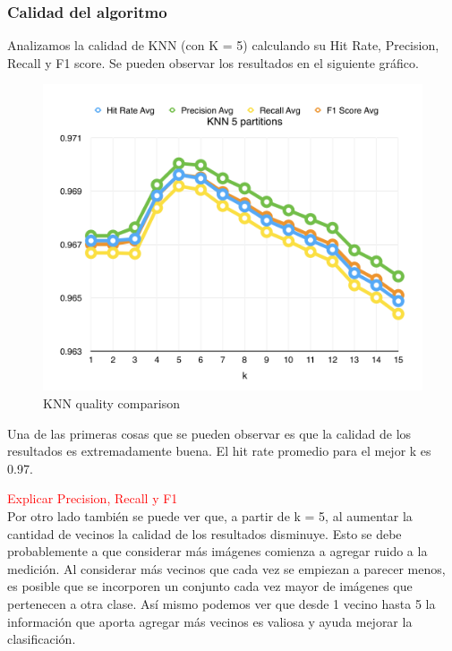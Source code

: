 \subsubsection{Calidad del algoritmo}

Analizamos la calidad de KNN (con K = 5) calculando su Hit Rate, Precision, Recall y F1 score. Se pueden observar los resultados en el siguiente gráfico.

\newpage

\begin{figure}[h!]
  \begin{center}
	\includegraphics[scale=0.7]{exp1/KNN-5p-Scores.png}
	\caption{KNN quality comparison}
  \end{center}
\end{figure}

Una de las primeras cosas que se pueden observar es que la calidad de los resultados es extremadamente buena. El hit rate promedio para el mejor k es 0.97.

\textcolor{red}{Explicar Precision, Recall y F1}\\

Por otro lado también se puede ver que, a partir de k = 5, al aumentar la cantidad de vecinos la calidad de los resultados disminuye. Esto se debe probablemente a que considerar más imágenes comienza a agregar ruido a la medición. Al considerar más vecinos que cada vez se empiezan a parecer menos, es posible que se incorporen un conjunto cada vez mayor de imágenes que pertenecen a otra clase. Así mismo podemos ver que desde 1 vecino hasta 5 la información que aporta agregar más vecinos es valiosa y ayuda mejorar la clasificación.\\

